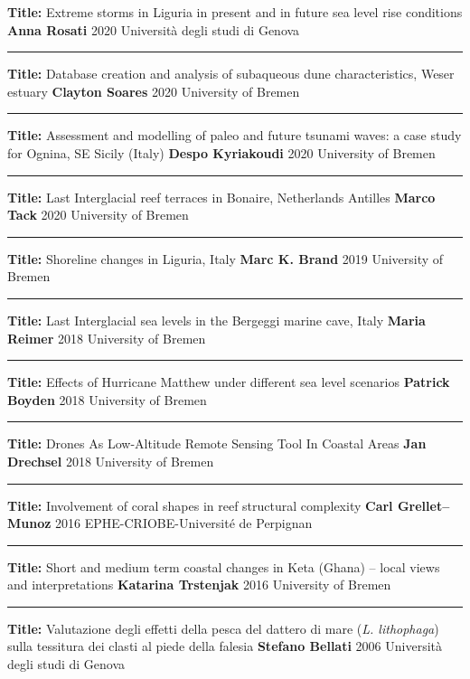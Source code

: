 \documentclass[%
               doublesided,
               paper=a4,
               fontsize=10pt
              ]{my-resume}
\begin{document}
    \publication
	{\textbf{Title:} Extreme storms in Liguria in present and in future sea level rise conditions} %
	{\textbf{Anna Rosati}} %
	{2020} %
	{Università degli studi di Genova} %
	{} %
\smallskip
\hrule
\smallskip
    \publication
	{\textbf{Title:} Database creation and analysis of subaqueous dune characteristics, Weser estuary} %
	{\textbf{Clayton Soares}} %
	{2020} %
	{University of Bremen} %
	{} %
\smallskip
\hrule
\smallskip
    \publication
	{\textbf{Title:} Assessment and modelling of paleo and future tsunami waves: a case study for Ognina, SE Sicily (Italy)} %
	{\textbf{Despo Kyriakoudi}} %
	{2020} %
	{University of Bremen} %
	{} %
\smallskip
\hrule
\smallskip
    \publication
	{\textbf{Title:} Last Interglacial reef terraces in Bonaire, Netherlands Antilles} %
	{\textbf{Marco Tack}} %
	{2020} %
	{University of Bremen} %
	{} %
\smallskip
\hrule
\smallskip
    \publication
	{\textbf{Title:} Shoreline changes in Liguria, Italy} %
	{\textbf{Marc K. Brand}} %
	{2019} %
	{University of Bremen} %
	{} %
\smallskip
\hrule
\smallskip
    \publication
	{\textbf{Title:} Last Interglacial sea levels in the Bergeggi marine cave, Italy} %
	{\textbf{Maria Reimer}} %
	{2018} %
	{University of Bremen} %
	{} %
\smallskip
\hrule
\smallskip
    \publication
	{\textbf{Title:} Effects of Hurricane Matthew under different sea level scenarios} %
	{\textbf{Patrick Boyden}} %
	{2018} %
	{University of Bremen} %
	{} %
\smallskip
\hrule
\smallskip
    \publication
	{\textbf{Title:} Drones As Low-Altitude Remote Sensing Tool In Coastal Areas} %
	{\textbf{Jan Drechsel}} %
	{2018} %
	{University of Bremen} %
	{} %
\smallskip
\hrule
\smallskip
    \publication
	{\textbf{Title:} Involvement of coral shapes in reef structural complexity} %
	{\textbf{Carl Grellet–Munoz}} %
	{2016} %
	{EPHE-CRIOBE-Université de Perpignan} %
	{} %
\smallskip
\hrule
\smallskip
    \publication
	{\textbf{Title:} Short and medium term coastal changes in Keta (Ghana) – local views and interpretations} %
	{\textbf{Katarina Trstenjak}} %
	{2016} %
	{University of Bremen} %
	{} %
\smallskip
\hrule
\smallskip
    \publication
	{\textbf{Title:} Valutazione degli effetti della pesca del dattero di mare (\textit{L. lithophaga}) sulla tessitura dei clasti al piede della falesia} %
	{\textbf{Stefano Bellati}} %
	{2006} %
	{Università degli studi di Genova} %
	{} %
\medskip
\end{document}
